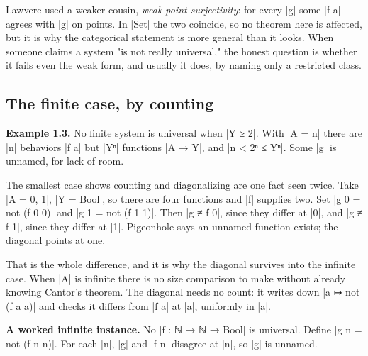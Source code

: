 \documentclass{memoir}
\begin{document}
Lawvere used a weaker cousin, \emph{weak point-surjectivity}: for every \LeanVerb|g| some \LeanVerb|f a|
agrees with \LeanVerb|g| on points. In \LeanVerb|Set| the two coincide, so no theorem here is
affected, but it is why the categorical statement is more general than it looks.
When someone claims a system "is not really universal," the honest question is
whether it fails even the weak form, and usually it does, by naming only a
restricted class.



\subsection{The finite case, by counting}\label{Two--Schemas--of--Impossibility-005F-005F-005F--Machine--Checked--Limits--of--Trustworthy--Machine--Learning-005F-005F-005F--and--Why--They--Tighten--with--Capability----The--Diagonal----Systems--that--describe--themselves----The--finite--case-005F-005F-005F--by--counting}

\textbf{Example 1.3.} No finite system is universal when \LeanVerb|Y ≥ 2|. With \LeanVerb|A = n| there
are \LeanVerb|n| behaviors \LeanVerb|f a| but \LeanVerb|Yⁿ| functions \LeanVerb|A → Y|, and \LeanVerb|n < 2ⁿ ≤ Yⁿ|. Some
\LeanVerb|g| is unnamed, for lack of room.

The smallest case shows counting and diagonalizing are one fact seen twice. Take
\LeanVerb|A = 0, 1|, \LeanVerb|Y = Bool|, so there are four functions and \LeanVerb|f| supplies two. Set
\LeanVerb|g 0 = not (f 0 0)| and \LeanVerb|g 1 = not (f 1 1)|. Then \LeanVerb|g ≠ f 0|, since they differ
at \LeanVerb|0|, and \LeanVerb|g ≠ f 1|, since they differ at \LeanVerb|1|. Pigeonhole says an unnamed
function exists; the diagonal points at one.

That is the whole difference, and it is why the diagonal survives into the
infinite case. When \LeanVerb|A| is infinite there is no size comparison to make without
already knowing Cantor's theorem. The diagonal needs no count: it writes down \LeanVerb|a ↦ not (f a a)|
and checks it differs from \LeanVerb|f a| at \LeanVerb|a|, uniformly in \LeanVerb|a|.

\textbf{A worked infinite instance.} No \LeanVerb|f : ℕ → ℕ → Bool| is universal. Define \LeanVerb|g n = not (f n n)|.
For each \LeanVerb|n|, \LeanVerb|g| and \LeanVerb|f n| disagree at \LeanVerb|n|, so \LeanVerb|g| is unnamed.
\end{document}
